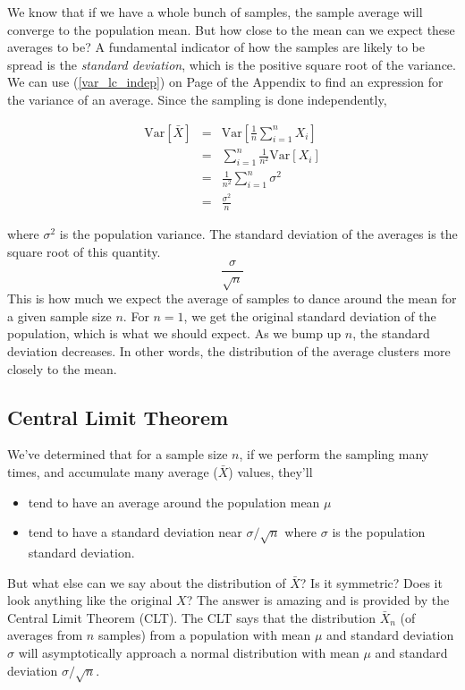 \documentclass[]{article}
\begin{document}
We know that if we have a whole bunch of samples, the
sample average will converge to the population mean.
But how close to the mean can we expect these averages
to be?  A fundamental indicator of how the samples are
likely to be spread is the \emph{standard deviation},
which is the positive square root of the variance.
We can use (\ref{var_lc_indep}) on Page 
\pageref{var_lc_indep} of the Appendix
to find an expression for the variance of an average.
Since the sampling is done independently,

\begin{eqnarray}
\mbox{Var}[\bar{X}] &= &\mbox{Var}\left[ \frac{1}{n} 
         \sum_{i=1}^n X_i \right] \nonumber \\
  &= &\sum_{i=1}^n  \frac{1}{n^2} \mbox{Var}[X_i] \nonumber \\
  &= &\frac{1}{n^2} \sum_{i=1}^n  \sigma^2 \nonumber \\
  &= &\frac{\sigma^2}{n} \label{sample_var1}
\end{eqnarray}

where $\sigma^2$ is the population variance.
The standard deviation of the averages is the square root of
this quantity.
$$
\frac{\sigma}{\sqrt{n}}
$$
This is how much
we expect the average of samples to dance around the mean for
a given sample size $n$.  For $n=1$, we get the original standard
deviation of the population, which is what we should expect.  As
we bump up $n$, the standard deviation decreases.  In other words,
the distribution of the average clusters more closely to the mean.

\subsection{Central Limit Theorem} \label{sec:clt}

We've determined that for a sample size $n$, if we perform
the sampling many times, and accumulate many average
($\bar{X}$) values, they'll

\begin{itemize}
\item tend to have an average around the population mean $\mu$
\item tend to have a standard deviation near $\sigma/\sqrt{n}$
   where $\sigma$ is the population standard deviation.
\end{itemize}

But what else can we say about the distribution of $\bar{X}$?
Is it symmetric?  Does it look anything like the original $X$?
The answer is amazing and is provided by the Central Limit
Theorem (CLT).  The CLT says that the distribution $\bar{X}_n$
(of averages from $n$ samples) from a  
population with mean $\mu$ and standard deviation $\sigma$ will
asymptotically approach a normal distribution with mean $\mu$
and standard deviation $\sigma/\sqrt{n}$.
\end{document}
